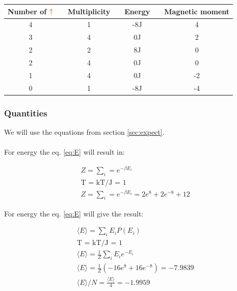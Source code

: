 \begin{center}
\label{tab:states-2x2-summary}
\begin{tabularx}{\textwidth}{c X c X c X c}
    \hline 
    \hline 
        Number of $\color{red}{\uparrow}$ && Multiplicity && Energy && Magnetic moment \\ 
    \hline
        4   &&      1      &&      -8J     &&       4       \\  
        3   &&      4      &&      0J      &&       2       \\
        2   &&      2      &&      8J      &&       0       \\
        2   &&      4      &&      0J      &&       0       \\
        1   &&      4      &&      0J      &&       -2      \\
        0   &&      1      &&      -8J     &&       -4      \\
    \hline
\end{tabularx}
\end{center}












\pagebreak
\subsubsection{Quantities}

We will use the equations from section \ref{sec:expect}.
\\
\\
For energy the eq. \ref{eq:E} will result in:

\begin{align*}
    &Z = \sum_i = e^{-\beta E_i}
    \\
    &\text{T = kT/J = 1} 
    \\
    &Z = \sum_i = e^{-\beta E_i} = 2e^{8} + 2e^{-8} + 12
\end{align*}


For energy the eq. \ref{eq:E} will give the result:

\begin{align*}
    &\langle E \rangle = \sum_i E_iP(E_i)
    \\
    &\text{T = kT/J = 1} 
    \\
    &\langle E \rangle = \frac{1}{Z} \sum_i E_i e^{-E_i}
    \\
    &\langle E \rangle = \frac{1}{Z} \left( -16 e^8 + 16e^{-8} \right) = -7.9839
    \\ 
    &\langle E \rangle /N= \frac{\langle E \rangle}{4} = -1.9959
\end{align*}


